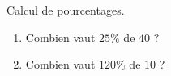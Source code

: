 
\begin{exercice}\label{exoSeconde-0023}

    Calcul de pourcentages.
    \begin{enumerate}
        \item
            Combien vaut \( 25\%\) de \( 40\) ?
        \item
            Combien vaut \( 120\%\) de \( 10\) ?
    \end{enumerate}

\end{exercice}
